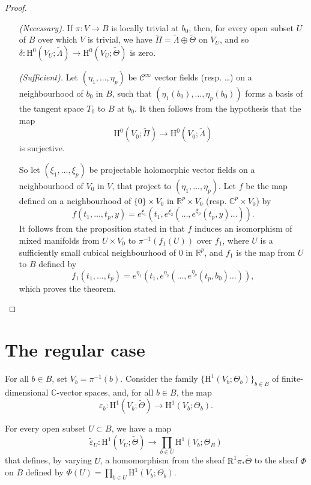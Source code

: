 \documentclass{article}
\theoremstyle{plain}
\theoremstyle{definition}
\newcommand{\RR}{\mathbb{R}}
\newcommand{\CC}{\mathbb{C}}
\newcommand{\HH}{\mathrm{H}}
\newcommand{\oldpage}[1]{\marginpar{\footnotesize$\Big\vert$ \textit{p.~#1}}}
\begin{document}
\begin{proof}
  \begin{itemize}
    \item[\emph{(Necessary).}]
      If $\pi\colon V\to B$ is locally trivial at $b_0$, then, for every open subset $U$ of $B$ over which $V$ is trivial, we have $\widetilde{\Pi}=\widetilde{\Lambda}\oplus\widetilde{\Theta}$ on $V_U$, and so $\delta\colon\HH^0(V_U;\widetilde{\Lambda})\to\HH^0(V_U;\widetilde{\Theta})$ is zero.
    \item[\emph{(Sufficient).}]
      Let $(\eta_1,\ldots,\eta_p)$ be $\mathscr{C}^\infty$ vector fields (resp. \ldots) on a neighbourhood of $b_0$ in $B$, such that $(\eta_1(b_0),\ldots,\eta_p(b_0))$ forms a basis of the tangent space $T_0$ to $B$ at $b_0$.
      It then follows from the hypothesis that the map
      \[
        \HH^0(V_0;\widetilde{\Pi}) \to \HH^0(V_0;\widetilde{\Lambda})
      \]
      is surjective.

      So let $(\xi_1,\ldots,\xi_p)$ be projectable holomorphic vector fields on a neighbourhood of $V_0$ in $V$, that project to $(\eta_1,\ldots,\eta_p)$.
      Let $f$ be the map defined on a neighbourhood of $\{0\}\times V_0$ in $\RR^p\times V_0$ (resp. $\CC^p\times V_0$) by
      \[
        f(t_1,\ldots,t_p,y) = e^{\xi_1}(t_1,e^{\xi_2}(\ldots,e^{\xi_p}(t_p,y)\ldots)).
      \]
      It follows from the proposition stated in \cite[\S III.2]{1} that $f$ induces an isomorphism of mixed manifolds from $U\times V_0$ to $\pi^{-1}(f_1(U))$ over $f_1$, where $U$ is a sufficiently small cubical neighbourhood of $0$ in $\RR^p$, and $f_1$ is the map from $U$ to $B$ defined by
      \[
        f_1(t_1,\ldots,t_p) = e^{\eta_1}(t_1,e^{\eta_2}(\ldots,e^{\eta_p}(t_p,b_0)\ldots)),
      \]
\oldpage{3-03}
      which proves the theorem.
  \end{itemize}
\end{proof}


\section{The regular case}
\label{II}

For all $b\in B$, set $V_b=\pi^{-1}(b)$.
Consider the family $\{\HH^1(V_b;\Theta_b)\}_{b\in B}$ of finite-dimensional $\CC$-vector spaces, and, for all $b\in B$,  the map
\[
  \varepsilon_b\colon \HH^1(V_b;\widetilde{\Theta}) \to \HH^1(V_b;\Theta_b).
\]

For every open subset $U\subset B$, we have a map
\[
  \widetilde{\varepsilon}_U\colon \HH^1(V_U;\widetilde{\Theta}) \to \prod_{b\in U}\HH^1(V_b;\Theta_B)
\]
that defines, by varying $U$, a homomorphism from the sheaf $\mathrm{R}^1\pi_*\widetilde{\Theta}$ to the sheaf $\Phi$ on $B$ defined by $\Phi(U)=\prod_{b\in U}\HH^1(V_b;\Theta_b)$.
\end{document}
